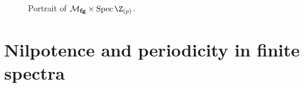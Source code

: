 \begin{sidewaysfigure}
\centering


%
\caption{Portrait of $\moduli{fg} \times \Spec \Z_{(p)}$.}\label{MfgPicture}
\end{sidewaysfigure}










\section{Nilpotence and periodicity in finite spectra}\label{NilpotenceAndPeriodicity}

